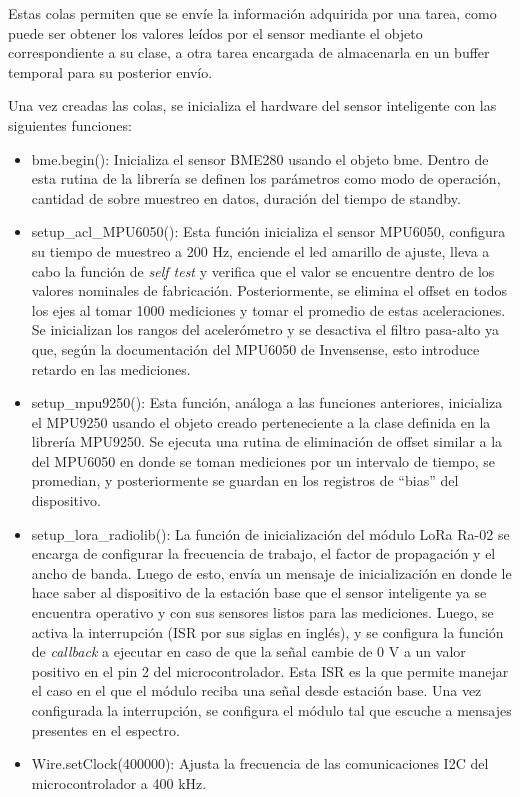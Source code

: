 Estas colas permiten que se envíe la información adquirida por una tarea, como puede ser obtener los valores leídos por el sensor mediante el objeto correspondiente a su clase, a otra tarea encargada de almacenarla en un buffer temporal para su posterior envío.

Una vez creadas las colas, se inicializa el hardware del sensor inteligente con las siguientes funciones:
\begin{itemize}
    
    \item bme.begin(): Inicializa el sensor BME280 usando el objeto bme. Dentro de esta rutina de la librería se definen los parámetros como modo de operación, cantidad de sobre muestreo en datos, duración del tiempo de standby.
    \item setup\_acl\_MPU6050(): Esta función inicializa el sensor MPU6050, configura su tiempo de muestreo a 200 Hz, enciende el led amarillo de ajuste, lleva a cabo la función de \textit{self test} y verifica que el valor se encuentre dentro de los valores nominales de fabricación. Posteriormente, se elimina el offset en todos los ejes al tomar 1000 mediciones y tomar el promedio de estas aceleraciones. Se inicializan los rangos del acelerómetro y se desactiva el filtro pasa-alto ya que, según la documentación del MPU6050 de Invensense, esto introduce retardo en las mediciones.
    \item setup\_mpu9250(): Esta función, análoga a las funciones anteriores, inicializa el MPU9250 usando el objeto creado perteneciente a la clase definida en la librería MPU9250. Se ejecuta una rutina de eliminación de offset similar a la del MPU6050 en donde se toman mediciones por un intervalo de tiempo, se promedian, y posteriormente se guardan en los registros de ``bias'' del dispositivo.
    \item setup\_lora\_radiolib(): La función de inicialización del módulo LoRa Ra-02 se encarga de configurar la frecuencia de trabajo, el factor de propagación y el ancho de banda. Luego de esto, envía un mensaje de inicialización en donde le hace saber al dispositivo de la estación base que el sensor inteligente ya se encuentra operativo y con sus sensores listos para las mediciones. Luego, se activa la interrupción (ISR por sus siglas en inglés), y se configura la función de \textit{callback} a ejecutar en caso de que la señal cambie de 0 V a un valor positivo en el pin 2 del microcontrolador. Esta ISR es la que permite manejar el caso en el que el módulo reciba una señal desde estación base. Una vez configurada la interrupción, se configura el módulo tal que escuche a mensajes presentes en el espectro.
    \item Wire.setClock(400000): Ajusta la frecuencia de las comunicaciones I2C del microcontrolador a 400 kHz.
\end{itemize}

